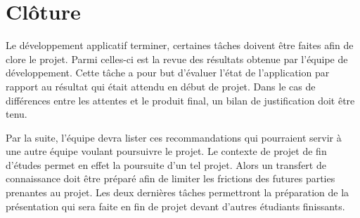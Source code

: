 \documentclass[letterpaper,twoside,12pt,french]{report}
\begin{document}
\section*{Clôture}
Le développement applicatif terminer, certaines tâches doivent être faites afin de clore le projet.
Parmi celles-ci est la revue des résultats obtenue par l'équipe de développement. Cette tâche a pour
but d'évaluer l'état de l'application par rapport au résultat qui était attendu en début de projet.
Dans le cas de différences entre les attentes et le produit final, un bilan de justification  doit
être tenu.
\par
Par la suite, l'équipe devra lister ces recommandations qui pourraient servir à une autre équipe voulant
poursuivre le projet. Le contexte de projet de fin d'études permet en effet la poursuite d'un tel
projet. Alors un transfert de connaissance doit être préparé afin de limiter les frictions des
futures parties prenantes au projet. Les deux dernières tâches permettront la préparation de la
présentation qui sera faite en fin de projet devant d'autres étudiants finissants.
\end{document}
